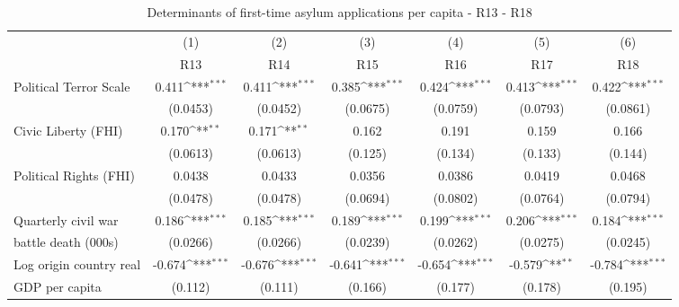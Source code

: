 \begin{table}[htbp]\centering \scriptsize
	\def\sym#1{\ifmmode^{#1}\else\(^{#1}\)\fi}
	\caption{Determinants of first-time asylum applications per capita - R13 - R18}
	\begin{tabular}{l*{6}{c}}
		\hline\hline
		&\multicolumn{1}{c}{(1)}     &\multicolumn{1}{c}{(2)}       &\multicolumn{1}{c}{(3)}       &\multicolumn{1}{c}{(4)}    	&\multicolumn{1}{c}{(5)}  	&\multicolumn{1}{c}{(6)}   \\
		&\multicolumn{1}{c}{R13}         &\multicolumn{1}{c}{R14}         &\multicolumn{1}{c}{R15}         &\multicolumn{1}{c}{R16}         &\multicolumn{1}{c}{R17}         &\multicolumn{1}{c}{R18}         \\
\hline
Political Terror Scale&       0.411\sym{***}&       0.411\sym{***}&       0.385\sym{***}&       0.424\sym{***}&       0.413\sym{***}&       0.422\sym{***}\\
                    &    (0.0453)         &    (0.0452)         &    (0.0675)         &    (0.0759)         &    (0.0793)         &    (0.0861)         \\
[0,5em]
Civic Liberty (FHI) &       0.170\sym{**} &       0.171\sym{**} &       0.162         &       0.191         &       0.159         &       0.166         \\
                    &    (0.0613)         &    (0.0613)         &     (0.125)         &     (0.134)         &     (0.133)         &     (0.144)         \\
[0,5em]
Political Rights (FHI)&      0.0438         &      0.0433         &      0.0356         &      0.0386         &      0.0419         &      0.0468         \\
                    &    (0.0478)         &    (0.0478)         &    (0.0694)         &    (0.0802)         &    (0.0764)         &    (0.0794)         \\
[0,5em]
Quarterly civil war &       0.186\sym{***}&       0.185\sym{***}&       0.189\sym{***}&       0.199\sym{***}&       0.206\sym{***}&       0.184\sym{***}\\
battle death (000s)                    &    (0.0266)         &    (0.0266)         &    (0.0239)         &    (0.0262)         &    (0.0275)         &    (0.0245)         \\
[0,5em]
Log origin country real &      -0.674\sym{***}&      -0.676\sym{***}&      -0.641\sym{***}&      -0.654\sym{***}&      -0.579\sym{**} &      -0.784\sym{***}\\
GDP per capita                    &     (0.112)         &     (0.111)         &     (0.166)         &     (0.177)         &     (0.178)         &     (0.195)         \\

\end{tabular}
\end{table}
